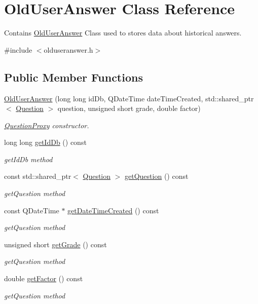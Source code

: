 \hypertarget{class_old_user_answer}{}\section{Old\+User\+Answer Class Reference}
\label{class_old_user_answer}


Contains \hyperlink{class_old_user_answer}{Old\+User\+Answer} Class used to stores data about historical answers.  




{\ttfamily \#include $<$olduseranswer.\+h$>$}

\subsection*{Public Member Functions}
\begin{DoxyCompactItemize}
\item 
\hyperlink{class_old_user_answer_a5054b14e998e9bbee9876dd2bc824283}{Old\+User\+Answer} (long long id\+Db, Q\+Date\+Time date\+Time\+Created, std\+::shared\+\_\+ptr$<$ \hyperlink{class_question}{Question} $>$ question, unsigned short grade, double factor)
\begin{DoxyCompactList}\small\item\em \hyperlink{class_question_proxy}{Question\+Proxy} constructor. \end{DoxyCompactList}\item 
long long \hyperlink{class_old_user_answer_a73670422ab34dd57ee78846c08f48ed3}{get\+Id\+Db} () const
\begin{DoxyCompactList}\small\item\em get\+Id\+Db method \end{DoxyCompactList}\item 
const std\+::shared\+\_\+ptr$<$ \hyperlink{class_question}{Question} $>$ \hyperlink{class_old_user_answer_a392760df6f3609a2d8a70b073135d1f0}{get\+Question} () const
\begin{DoxyCompactList}\small\item\em get\+Question method \end{DoxyCompactList}\item 
const Q\+Date\+Time $\ast$ \hyperlink{class_old_user_answer_aa731331582341ab7bce7d558d4c10ddd}{get\+Date\+Time\+Created} () const
\begin{DoxyCompactList}\small\item\em get\+Question method \end{DoxyCompactList}\item 
unsigned short \hyperlink{class_old_user_answer_ac5a1402d4a962a5001493fdb3c30a287}{get\+Grade} () const
\begin{DoxyCompactList}\small\item\em get\+Question method \end{DoxyCompactList}\item 
double \hyperlink{class_old_user_answer_a2efbda41f588dee155655b9c1e99b63a}{get\+Factor} () const
\begin{DoxyCompactList}\small\item\em get\+Question method \end{DoxyCompactList}\end{DoxyCompactItemize}


